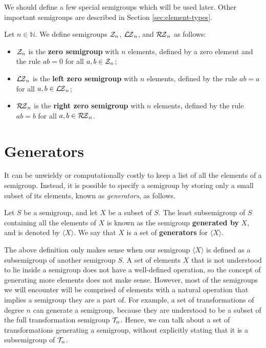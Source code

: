 We should define a few special semigroups which will be used later.  Other
important semigroups are described in Section \ref{sec:element-types}.

\begin{definition}
  \label{def:zn}
  Let $n \in \mathbb{N}$.  We define semigroups $\mathcal{Z}_n$, $\mathcal{L\!Z}_n$, and $\mathcal{R\!Z}_n$ as
  follows:
  \begin{itemize}
  \item $\mathcal{Z}_n$ is the \textbf{zero semigroup} with $n$ elements, defined by a
    zero element and the rule $ab=0$ for all $a,b \in \mathcal{Z}_n$;
  \item $\mathcal{L\!Z}_n$ is the \textbf{left zero semigroup} with $n$ elements, defined
    by the rule $ab=a$ for all $a,b \in \mathcal{L\!Z}_n$;
  \item $\mathcal{R\!Z}_n$ is the \textbf{right zero semigroup} with $n$ elements, defined
    by the rule $ab=b$ for all $a,b \in \mathcal{R\!Z}_n$.
  \end{itemize}
\end{definition}

\section{Generators}
\label{sec:intro-generators}

It can be unwieldy or computationally costly to keep a list of all the elements
of a semigroup.  Instead, it is possible to specify a semigroup by storing only
a small subset of its elements, known as \textit{generators}, as follows.

\begin{definition}
  \label{def:generator}
  Let $S$ be a semigroup, and let $X$ be a subset of $S$.  The least
  subsemigroup of $S$ containing all the elements of $X$ is known as the
  semigroup \textbf{generated by} $X$, and is denoted by $\langle X \rangle$.
  We say that $X$ is a set of \textbf{generators} for $\langle X \rangle$.
\end{definition}

The above definition only makes sense when our semigroup $\langle X \rangle$ is
defined as a subsemigroup of another semigroup $S$.  A set of elements $X$ that
is not understood to lie inside a semigroup does not have a well-defined
operation, so the concept of generating more elements does not make sense.
However, most of the semigroups we will encounter will be comprised of elements
with a natural operation that implies a semigroup they are a part of.
For example, a set of transformations of degree $n$ can generate a semigroup,
because they are understood to be a subset of the full transformation semigroup
$\mathcal{T}_n$.  Hence, we can talk about a set of transformations generating a
semigroup, without explicitly stating that it is a subsemigroup of $\mathcal{T}_n$.

